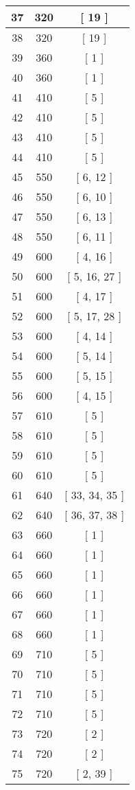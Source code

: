 \begin{center}
\begin{longtable}[H]{|| c c c ||}
37 & 320 & [ 19 ]
\\\hline
38 & 320 & [ 19 ]
\\\hline
39 & 360 & [ 1 ]
\\\hline
40 & 360 & [ 1 ]
\\\hline
41 & 410 & [ 5 ]
\\\hline
42 & 410 & [ 5 ]
\\\hline
43 & 410 & [ 5 ]
\\\hline
44 & 410 & [ 5 ]
\\\hline
45 & 550 & [ 6, 12 ]
\\\hline
46 & 550 & [ 6, 10 ]
\\\hline
47 & 550 & [ 6, 13 ]
\\\hline
48 & 550 & [ 6, 11 ]
\\\hline
49 & 600 & [ 4, 16 ]
\\\hline
50 & 600 & [ 5, 16, 27 ]
\\\hline
51 & 600 & [ 4, 17 ]
\\\hline
52 & 600 & [ 5, 17, 28 ]
\\\hline
53 & 600 & [ 4, 14 ]
\\\hline
54 & 600 & [ 5, 14 ]
\\\hline
55 & 600 & [ 5, 15 ]
\\\hline
56 & 600 & [ 4, 15 ]
\\\hline
57 & 610 & [ 5 ]
\\\hline
58 & 610 & [ 5 ]
\\\hline
59 & 610 & [ 5 ]
\\\hline
60 & 610 & [ 5 ]
\\\hline
61 & 640 & [ 33, 34, 35 ]
\\\hline
62 & 640 & [ 36, 37, 38 ]
\\\hline
63 & 660 & [ 1 ]
\\\hline
64 & 660 & [ 1 ]
\\\hline
65 & 660 & [ 1 ]
\\\hline
66 & 660 & [ 1 ]
\\\hline
67 & 660 & [ 1 ]
\\\hline
68 & 660 & [ 1 ]
\\\hline
69 & 710 & [ 5 ]
\\\hline
70 & 710 & [ 5 ]
\\\hline
71 & 710 & [ 5 ]
\\\hline
72 & 710 & [ 5 ]
\\\hline
73 & 720 & [ 2 ]
\\\hline
74 & 720 & [ 2 ]
\\\hline
75 & 720 & [ 2, 39 ]

\end{longtable}
\end{center}

